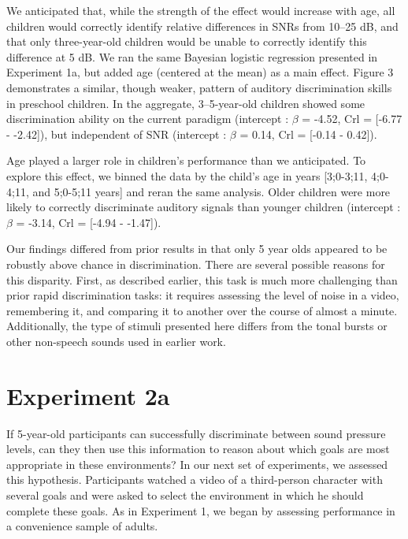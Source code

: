 \documentclass[10pt, letterpaper]{article}
\begin{document}
We anticipated that, while the strength of the effect would increase
with age, all children would correctly identify relative differences in
SNRs from 10--25 dB, and that only three-year-old children would be
unable to correctly identify this difference at 5 dB. We ran the same
Bayesian logistic regression presented in Experiment 1a, but added age
(centered at the mean) as a main effect. Figure 3 demonstrates a
similar, though weaker, pattern of auditory discrimination skills in
preschool children. In the aggregate, 3--5-year-old children showed some
discrimination ability on the current paradigm (intercept : \(\beta\) =
-4.52, Crl = {[}-6.77 - -2.42{]}), but independent of SNR (intercept :
\(\beta\) = 0.14, Crl = {[}-0.14 - 0.42{]}).

Age played a larger role in children's performance than we anticipated.
To explore this effect, we binned the data by the child's age in years
{[}3;0-3;11, 4;0-4;11, and 5;0-5;11 years{]} and reran the same
analysis. Older children were more likely to correctly discriminate
auditory signals than younger children (intercept : \(\beta\) = -3.14,
Crl = {[}-4.94 - -1.47{]}).

Our findings differed from prior results in that only 5 year olds
appeared to be robustly above chance in discrimination. There are
several possible reasons for this disparity. First, as described
earlier, this task is much more challenging than prior rapid
discrimination tasks: it requires assessing the level of noise in a
video, remembering it, and comparing it to another over the course of
almost a minute. Additionally, the type of stimuli presented here
differs from the tonal bursts or other non-speech sounds used in earlier
work.

\hypertarget{experiment-2a}{%
\section{Experiment 2a}\label{experiment-2a}}

If 5-year-old participants can successfully discriminate between sound
pressure levels, can they then use this information to reason about
which goals are most appropriate in these environments? In our next set
of experiments, we assessed this hypothesis. Participants watched a
video of a third-person character with several goals and were asked to
select the environment in which he should complete these goals. As in
Experiment 1, we began by assessing performance in a convenience sample
of adults.
\end{document}
